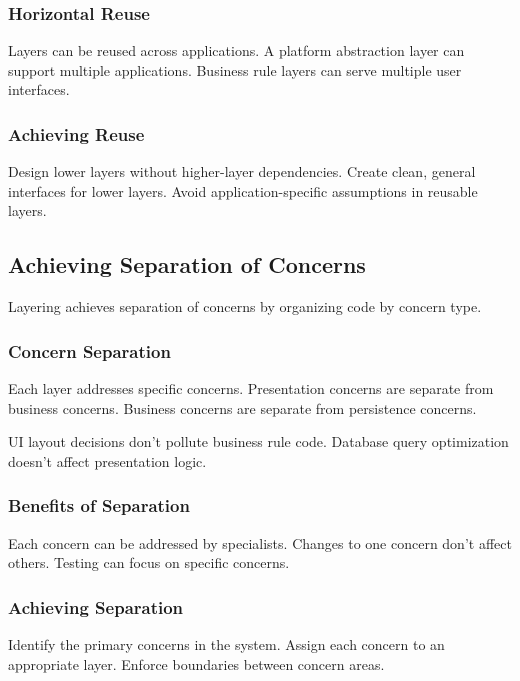 \documentclass[11pt]{article}
\begin{document}
\subsubsection{Horizontal Reuse}

Layers can be reused across applications. A platform abstraction layer can support multiple applications. Business rule layers can serve multiple user interfaces.

\subsubsection{Achieving Reuse}

Design lower layers without higher-layer dependencies. Create clean, general interfaces for lower layers. Avoid application-specific assumptions in reusable layers.

\subsection{Achieving Separation of Concerns}

Layering achieves separation of concerns by organizing code by concern type.

\subsubsection{Concern Separation}

Each layer addresses specific concerns. Presentation concerns are separate from business concerns. Business concerns are separate from persistence concerns.

UI layout decisions don't pollute business rule code. Database query optimization doesn't affect presentation logic.

\subsubsection{Benefits of Separation}

Each concern can be addressed by specialists. Changes to one concern don't affect others. Testing can focus on specific concerns.

\subsubsection{Achieving Separation}

Identify the primary concerns in the system. Assign each concern to an appropriate layer. Enforce boundaries between concern areas.
\end{document}

